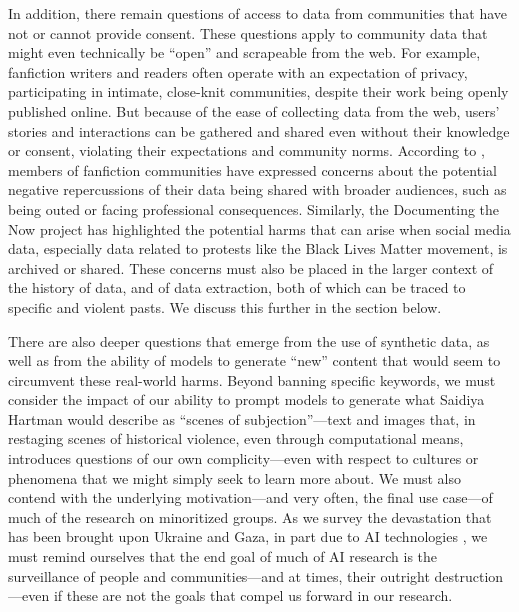 In addition, there remain questions of access to data from communities that have not or cannot provide consent. These questions apply to community data that might even technically be ``open'' and scrapeable from the web. For example, fanfiction writers and readers often operate with an expectation of privacy, participating in intimate, close-knit communities, despite their work being openly published online. But because of the ease of collecting data from the web, users’ stories and interactions can be gathered and shared even without their knowledge or consent, violating their expectations and community norms. According to \citet{Dym_Fiesler_2020}, members of fanfiction communities have expressed concerns about the potential negative repercussions of their data being shared with broader audiences, such as being outed or facing professional consequences. Similarly, the Documenting the Now project has highlighted the potential harms that can arise when social media data, especially data related to protests like the Black Lives Matter movement, is archived or shared. These concerns must also be placed in the larger context of the history of data, and of data extraction, both of which can be traced to specific and violent pasts. We discuss this further in the section below.

There are also deeper questions that emerge from the use of synthetic data, as well as from the ability of models to generate ``new'' content that would seem to circumvent these real-world harms. Beyond banning specific keywords, we must consider the impact of our ability to prompt models to generate what Saidiya Hartman would describe as ``scenes of subjection''---text and images that, in restaging scenes of historical violence, even through computational means, introduces questions of our own complicity---even with respect to cultures or phenomena that we might simply seek to learn more about. We must also contend with the underlying motivation---and very often, the final use case---of much of the research on minoritized groups. As we survey the devastation that has been brought upon Ukraine and Gaza, in part due to AI technologies \cite{noauthor_tech_nodate,tharoor_analysis_2024}, we must remind ourselves that the end goal of much of AI research is the surveillance of people and communities---and at times, their outright destruction---even if these are not the goals that compel us forward in our research.  